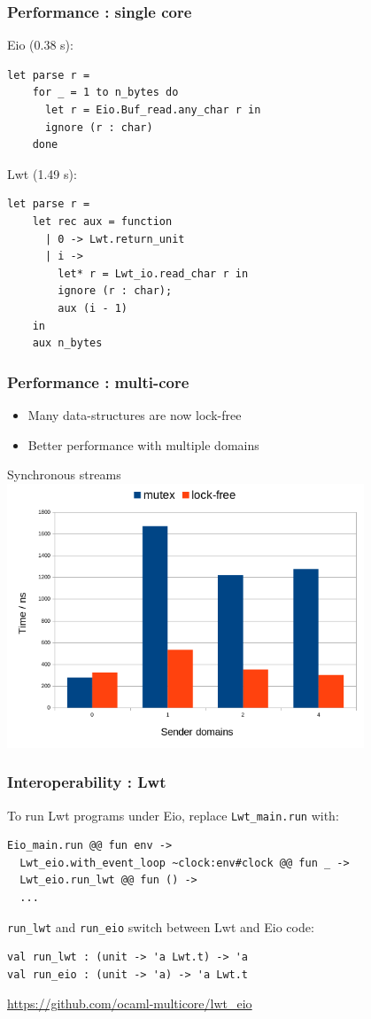 \documentclass{beamer}
\begin{document}
\begin{frame}[fragile]
	\frametitle{Performance : single core}
	\bigskip
	Eio (0.38 s):
\begin{lstlisting}[style=ocaml]
  let parse r =
    for _ = 1 to n_bytes do
      let r = Eio.Buf_read.any_char r in
      ignore (r : char)
    done
\end{lstlisting}
	\bigskip
	Lwt (1.49 s):
\begin{lstlisting}[style=ocaml]
  let parse r =
    let rec aux = function
      | 0 -> Lwt.return_unit
      | i ->
        let* r = Lwt_io.read_char r in
        ignore (r : char);
        aux (i - 1)
    in
    aux n_bytes
\end{lstlisting}
\end{frame}

\begin{frame}
	\frametitle{Performance : multi-core}
	\bigskip
	\begin{itemize}
		\item Many data-structures are now lock-free
		\item Better performance with multiple domains
	\end{itemize}
	\bigskip
	\centering
	Synchronous streams\\
	\includegraphics[width=0.8\textwidth]{lock-free.png}
\end{frame}

\begin{frame}[fragile]
	\frametitle{Interoperability : Lwt}
	To run Lwt programs under Eio, replace \verb|Lwt_main.run| with:
\begin{lstlisting}[style=ocaml]
  Eio_main.run @@ fun env ->
  Lwt_eio.with_event_loop ~clock:env#clock @@ fun _ ->
  Lwt_eio.run_lwt @@ fun () ->
  ...
\end{lstlisting}
\verb|run_lwt| and \verb|run_eio| switch between Lwt and Eio code:
\begin{lstlisting}[style=ocaml]
val run_lwt : (unit -> 'a Lwt.t) -> 'a
val run_eio : (unit -> 'a) -> 'a Lwt.t
\end{lstlisting}
	\bigskip
	\url{https://github.com/ocaml-multicore/lwt_eio}
\end{frame}
\end{document}
